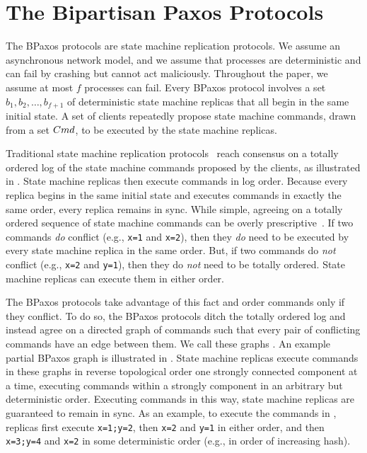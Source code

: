 \section{The Bipartisan Paxos Protocols}


The BPaxos protocols are state machine replication protocols. We assume an
asynchronous network model, and we assume that processes are deterministic and
can fail by crashing but cannot act maliciously. Throughout the paper, we
assume at most $f$ processes can fail. Every BPaxos protocol involves a set
$b_1, b_2, \ldots, b_{f+1}$ of deterministic state machine replicas that all
begin in the same initial state. A set of clients repeatedly propose state
machine commands, drawn from a set $Cmd$, to be executed by the state machine
replicas.

Traditional state machine replication protocols~\cite{liskov2012viewstamped,
lamport1998part} reach consensus on a totally ordered log of the state machine
commands proposed by the clients, as illustrated in . State
machine replicas then execute commands in log order. Because every replica
begins in the same initial state and executes commands in exactly the same
order, every replica remains in sync.
%
While simple, agreeing on a totally ordered sequence of state machine commands
can be overly prescriptive~\cite{lamport2005generalized, moraru2013there}. If
two commands \emph{do} conflict (e.g., \texttt{x=1} and \texttt{x=2}), then
they \emph{do} need to be executed by every state machine replica in the same
order.  But, if two commands do \emph{not} conflict (e.g., \texttt{x=2} and
\texttt{y=1}), then they do \emph{not} need to be totally ordered. State
machine replicas can execute them in either order.

The BPaxos protocols take advantage of this fact and order commands only if
they conflict. To do so, the BPaxos protocols ditch the totally ordered log and
instead agree on a directed graph of commands such that every pair of
conflicting commands have an edge between them. We call these graphs
. An example partial BPaxos graph is illustrated
in . State machine replicas execute commands in these graphs
in reverse topological order one strongly connected component at a time,
executing commands within a strongly component in an arbitrary but
deterministic order. Executing commands in this way, state machine replicas are
guaranteed to remain in sync. As an example, to execute the commands in
, replicas first execute \texttt{x=1;y=2}, then \texttt{x=2}
and \texttt{y=1} in either order, and then \texttt{x=3;y=4} and \texttt{x=2} in
some deterministic order (e.g., in order of increasing hash).

